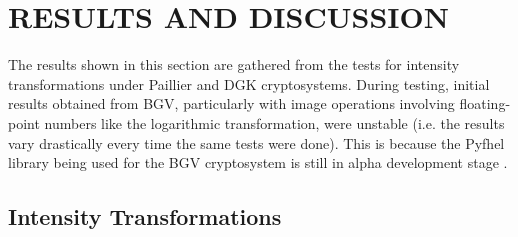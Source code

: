 \chapter{RESULTS AND DISCUSSION}
The results shown in this section are gathered from the tests for intensity transformations under Paillier and DGK cryptosystems. During testing, initial results obtained from BGV, particularly with image operations involving floating-point numbers like the logarithmic transformation, were unstable (i.e. the results vary drastically every time the same tests were done). This is because the Pyfhel library being used for the BGV cryptosystem is still in alpha development stage \cite{pyfhel_2018}.


\section{Intensity Transformations}

